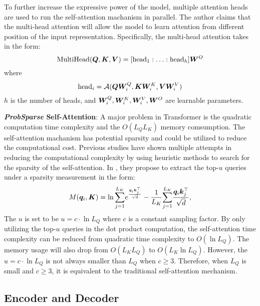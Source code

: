 \documentclass{article} %
\begin{document}
To further increase the expressive power of the model, multiple attention heads are used to run the self-attention machanism in parallel.
The author claims that the multi-head attention will allow the model to learn attention from different position of the input representation.
Specifically, the multi-head attention takes in the form:
\begin{equation}
\mathrm{MultiHead} ( {\bm{Q}}, {\bm{K}}, {\bm{V}} ) = [\mathrm{head}_{1}:\ldots:\mathrm{head}_{h}] {\bm{W}}^{O}
\end{equation}
where
\begin{equation}
\mathrm{head}_{i} = {\mathcal{A}} ({\bm{Q}} {\bm{W}}_{i}^{Q}, {\bm{K}} {\bm{W}}_{i}^{K}, {\bm{V}} {\bm{W}}_{i}^{V} )
\end{equation}
$h$ is the number of heads, and ${\bm{W}}_{i}^{Q}, {\bm{W}}_{i}^{K}, {\bm{W}}_{i}^{V}, {\bm{W}}^{O}$ are learnable parameters.

\textbf{\textit{ProbSparse} Self-Attention}: 
A major problem in Transformer is the quadratic computation time complexity and the $O(L_{Q} L_{K})$ memory comsumption.
The self-attention machanism has potential sparsity and could be utilized to reduce the computational cost.
Previous studies \citep{child2019sparsetransformer, NEURIPS2019_6775a063, Beltagy2020Longformer} have shown multiple attempts in reducing the computational complexity by using heuristic methods to search for the sparsity of the self-attention.
In \citet{haoyietal-informer-2021}, they propose to extract the top-$u$ queries under a sparsity measurement in the form:
\begin{equation}
        M({\bm{q}}_{i}, {\bm{K}}) = \ln{\underset{j=1}{\overset{L_{K}}{\sum}} e^{\frac{{\bm{q}}_{i}{\bm{k}}_{j}^{\top}}{\sqrt{d}}}} - \frac{1}{L_{K}} \overset{L_{K}}{\underset{j=1}{\sum}} \frac{{\bm{q}}_{i} {\bm{k}}_{j}^{\top}}{\sqrt{d}},
\end{equation}
The $u$ is set to be $u = c \cdot \ln{L_{Q}}$ where $c$ is a constant sampling factor.
By only utilizing the top-$u$ queries in the dot product computation, the self-attention time complexity can be reduced from quadratic time complexity to $O(\ln{L_{Q}})$.
The memory usage will also drop from $O(L_{K}L_{Q})$ to $O(L_{K}\ln{L_{Q}})$.
However, the $u = c \cdot \ln{L_{Q}}$ is not always smaller than $L_{Q}$ when $c \ge 3$.
Therefore, when $L_{Q}$ is small and $c \ge 3$, it is equivalent to the traditional self-attention mechanism.

\subsection{Encoder and Decoder}
\end{document}

